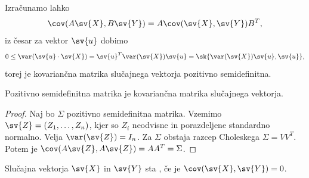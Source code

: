 
Izračunamo lahko
\[
  \cov(A \sv{X}, B \sv{Y})
  = A \cov(\sv{X}, \sv{Y}) B^T,
\]
iz česar za vektor $\sv{u}$ dobimo
\[
  0 \le \var(\sv{u} \cdot \sv{X})
  = \sv{u}^T \var(\sv{X}) \sv{u}
  = \sk{\var(\sv{X}) \sv{u}, \sv{u}},
\]
torej je kovariančna matrika slučajnega vektorja pozitivno semidefinitna.

\begin{trditev}
  Pozitivno semidefinitna matrika je kovariančna matrika slučajnega vektorja.
\end{trditev}

\begin{proof}
  Naj bo $\Sigma$ pozitivno semidefinitna matrika.
  Vzemimo $\sv{Z} = (Z_1, \ldots, Z_n)$, kjer so $Z_i$ neodvisne in porazdeljene
  standardno normalno.
  Velja $\var(\sv{Z}) = I_n$.
  Za $\Sigma$ obstaja razcep Choleskega $\Sigma = V V^T$.
  Potem je $\cov(A \sv{Z}, A \sv{Z}) = A A^T = \Sigma$.
\end{proof}


\begin{definicija}
  Slučajna vektorja $\sv{X}$ in $\sv{Y}$ sta , če je
  $\cov(\sv{X}, \sv{Y}) = 0$.
\end{definicija}
